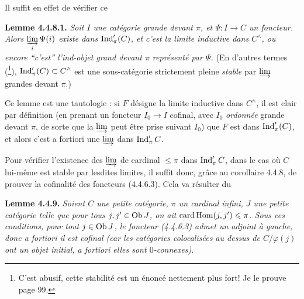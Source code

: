 Il suffit en effet de vérifier ce

\textbf{Lemme 4.4.8.1.} \textit{Soit $I$ une catégorie grande devant $\pi$, et $\Psi : I \longrightarrow C$ un foncteur. Alors $\varinjlim\limits_{i} \Psi(i)$ existe dans $\operatorname{Ind}'_\pi(C)$, et c'est la limite inductive dans $C^\wedge$, ou encore “c'est” l'ind-objet grand devant $\pi$ représenté par $\Psi$.} (En d'autres termes (\footnote[24]{C'est abusif, cette stabilité est un énoncé nettement plus fort! Je le prouve page 99.}), $\operatorname{Ind}'_\pi(C) \subset C^\wedge$ est une sous-catégorie strictement pleine \textit{stable} par $\varinjlim$ grandes devant $\pi$.)

Ce lemme est une tautologie : si $F$ désigne la limite inductive dans $C^\wedge$, il est clair par définition (en prenant un foncteur $I_0 \longrightarrow I$ cofinal, avec $I_0$ \textit{ordonnée} grande devant $\pi$, de sorte que la $\varinjlim$ peut être prise suivant $I_0$) que $F$ est dans $\operatorname{Ind}'_\pi(C)$, et alors c'est a fortiori une $\varinjlim$ dans $\operatorname{Ind}'_\pi C$.

Pour vérifier l'existence des $\varinjlim$ de cardinal $\leqslant \pi$ dans $\operatorname{Ind}'_\pi C$, dans le cas où $C$ lui-même est stable par lesdites limites, il suffit donc, grâce au corollaire 4.4.8, de prouver la cofinalité des foncteurs (4.4.6.3). Cela va résulter du

\textbf{Lemme 4.4.9.} \textit{Soient $C$ une petite catégorie, $\pi$ un cardinal infini, $J$ une petite catégorie telle que pour tous $j, j' \in \mathrm{Ob}\, J$, on ait $\operatorname{card} \mathrm{Hom}(j,j') \leqslant \pi$. Sous ces conditions, pour tout $j \in \mathrm{Ob}\, J$, le foncteur (4.4.6.3) \textup{admet un adjoint à gauche,} donc a fortiori il est cofinal (car les catégories colocalisées au dessus de $C/\varphi(j)$ ont un objet initial, a fortiori elles sont $0$-connexes).}

